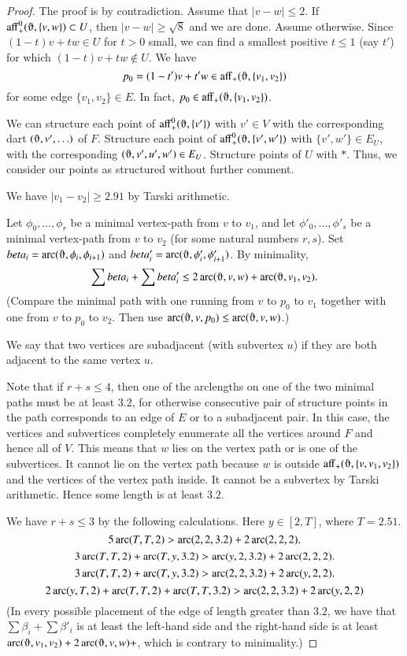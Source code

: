 \begin{proof}
The proof is by contradiction.  Assume that $|v-w|\le 2$.
If $\op{aff}_+^0(\orgn,\{v,w\})\subset U$, then $|v-w|\ge\sqrt8$ and
we are done.  Assume otherwise.  Since $(1-t)v + t w\in U$ for $t>0$
small, we can find a smallest positive $t\le 1$ (say $t'$) for which
$(1-t)v + t w\not\in U$.  We have
$$p_0 = (1-t') v + t' w \in \op{aff}_+(\orgn,\{v_1,v_2\})$$
for some edge $\{v_1,v_2\}\in E$.  
In fact, $p_0\in \op{aff}_+(\orgn,\{v_1,v_2\})$.

We can structure each point of $\op{aff}^0_+(\orgn,\{v'\})$ with
$v'\in V$ with the corresponding dart $(\orgn,v',\ldots)$ of $F$.
Structure each point of $\op{aff}_+^0(\orgn,\{v',w'\})$ with
$\{v',w'\}\in E_U$, with the corresponding $(\orgn,v',u',w')\in E_U$.
Structure points of $U$ with $*$. Thus, we consider our points as
structured without further comment.


We have $|v_1-v_2|\ge2.91$ by Tarski arithmetic.

Let $\phi_0,\ldots,\phi_r$ be a minimal vertex-path from $v$ to
$v_1$, and let $\phi'_0,\ldots,\phi'_s$ be a minimal vertex-path from
$v$ to $v_2$ (for some natural numbers $r,s$). 
Set $\beta_i = \arc(\orgn,\phi_i,\phi_{i+1})$ and
$\beta'_i = \arc(\orgn,\phi'_i,\phi'_{i+1})$.
By minimality, 
  $$
   \sum \beta_i + \sum \beta'_i \le 2 \arc(\orgn,v,w) + \arc(\orgn,v_1,v_2).
  $$
(Compare the minimal path with one running from $v$ to $p_0$ to $v_1$
together with one from $v$ to $p_0$ to $v_2$. Then use $\arc(\orgn,v,p_0)\le
\arc(\orgn,v,w)$.)

We say that two vertices are subadjacent (with subvertex $u$)
if they are both adjacent
to the same vertex $u$.

Note that if $r+s\le4$, then one of the arclengths on one of the two minimal paths
must be at
least $3.2$, for otherwise consecutive pair of structure points
in the path corresponds to
an 
edge of $E$ or to a subadjacent pair. 
In this case, the vertices and subvertices completely enumerate
all the vertices around $F$ and hence all of $V$.  This means that
$w$ lies on the vertex path or is one of the subvertices.  It
cannot lie on the vertex path because $w$ is outside $\op{aff}_+(\orgn,
\{v,v_1,v_2\})$ and the vertices of the vertex path inside.
It cannot be a subvertex by Tarski arithmetic.
Hence some length is at least $3.2$.

We have $r+s\le3$ by the following calculations.  Here
$y\in[2,T]$, where $T=2.51$.
    $$5\operatorname{arc}(T,T,2) > \operatorname{arc}(2,2,3.2)+ 2 \operatorname{arc}(2,2,2).$$
    $$3\operatorname{arc}(T,T,2) + \operatorname{arc}(T,y,3.2) > \operatorname{arc}(y,2,3.2) + 2 \operatorname{arc}(2,2,2).$$
    $$3\operatorname{arc}(T,T,2) + \operatorname{arc}(T,y,3.2) > \operatorname{arc}(2,2,3.2) + 2\operatorname{arc}(y,2,2).$$
    $$2\operatorname{arc}(y,T,2) + \operatorname{arc}(T,T,2) + \operatorname{arc}(T,T,3.2) > \operatorname{arc}(2,2,3.2) + 2\operatorname{arc}(y,2,2) $$
(In every possible placement of the edge of length greater than $3.2$,
we have that $\sum \beta_i + \sum\beta'_i$ is at least the left-hand side
and the right-hand side is at least $\arc(\orgn,v_1,v_2)+2\arc(\orgn,v,w)+$,
which is contrary to minimality.)


\end{proof}
